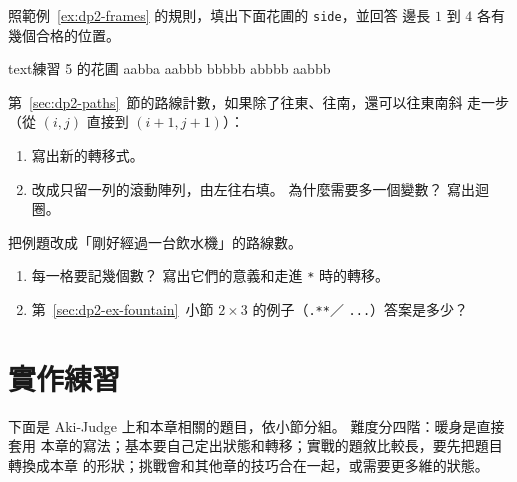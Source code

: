\begin{drills}[label=drills:dp2]
\item 照範例~\ref{ex:dp2-frames} 的規則，填出下面花圃的 \texttt{side}，並回答
邊長 $1$ 到 $4$ 各有幾個合格的位置。
\begin{code}{text}{練習 5 的花圃}
aabba
aabbb
bbbbb
abbbb
aabbb
\end{code}

\item 第~\ref{sec:dp2-paths}~節的路線計數，如果除了往東、往南，還可以往東南斜
走一步（從 $(i, j)$ 直接到 $(i + 1, j + 1)$）：
\begin{enumerate}
\item 寫出新的轉移式。
\item 改成只留一列的滾動陣列，由左往右填。 為什麼需要多一個變數？ 寫出迴圈。
\end{enumerate}

\item 把例題改成「剛好經過一台飲水機」的路線數。
\begin{enumerate}
\item 每一格要記幾個數？ 寫出它們的意義和走進 \texttt{*} 時的轉移。
\item 第~\ref{sec:dp2-ex-fountain}~小節 $2 \times 3$ 的例子（\texttt{.**}／
\texttt{...}）答案是多少？
\end{enumerate}
\end{drills}

\section{實作練習}
\label{sec:dp2-practice}

下面是 Aki-Judge 上和本章相關的題目，依小節分組。 難度分四階：暖身是直接套用
本章的寫法；基本要自己定出狀態和轉移；實戰的題敘比較長，要先把題目轉換成本章
的形狀；挑戰會和其他章的技巧合在一起，或需要更多維的狀態。

